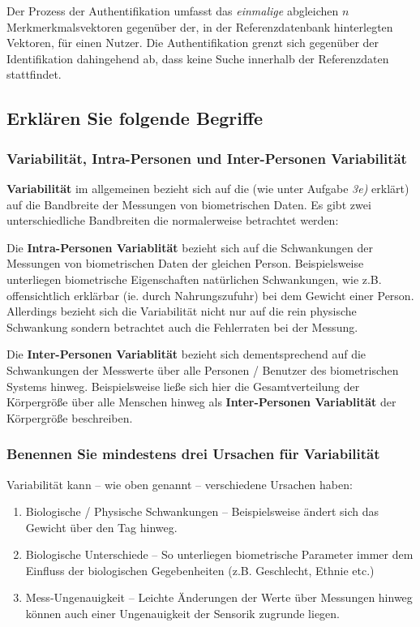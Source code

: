 \documentclass{article}
\begin{document}
Der Prozess der Authentifikation umfasst das \textit{einmalige} abgleichen $n$ Merkmerkmalsvektoren 
gegenüber der, in der Referenzdatenbank hinterlegten Vektoren, für einen Nutzer. 
Die Authentifikation grenzt sich gegenüber der Identifikation dahingehend ab, dass keine Suche innerhalb 
der Referenzdaten stattfindet.

\subsection{Erklären Sie folgende Begriffe}

\subsubsection{Variabilität, Intra-Personen und Inter-Personen Variabilität}

\textbf{Variabilität} im allgemeinen bezieht sich auf die (wie unter Aufgabe \textit{3e)} erklärt) auf
die Bandbreite der Messungen von biometrischen Daten. Es gibt zwei unterschiedliche Bandbreiten die 
normalerweise betrachtet werden:

Die \textbf{Intra-Personen Variablität} bezieht sich auf die Schwankungen der Messungen von biometrischen
Daten der gleichen Person. Beispielsweise unterliegen biometrische Eigenschaften natürlichen Schwankungen,
wie z.B. offensichtlich erklärbar (ie. durch Nahrungszufuhr) bei dem Gewicht einer Person. Allerdings
bezieht sich die Variabilität nicht nur auf die rein physische Schwankung sondern betrachtet auch die
Fehlerraten bei der Messung.

Die \textbf{Inter-Personen Variablität} bezieht sich dementsprechend auf die Schwankungen der Messwerte 
über alle Personen / Benutzer des biometrischen Systems hinweg. Beispielsweise ließe sich hier die 
Gesamtverteilung der Körpergröße über alle Menschen hinweg als \textbf{Inter-Personen Variablität} der 
Körpergröße beschreiben.

\subsubsection{Benennen Sie mindestens drei Ursachen für Variabilität}

Variabilität kann – wie oben genannt – verschiedene Ursachen haben:

\begin{enumerate}
	\item Biologische / Physische Schwankungen – Beispielsweise ändert sich das Gewicht über den Tag hinweg.
	\item Biologische Unterschiede – So unterliegen biometrische Parameter immer dem Einfluss der biologischen Gegebenheiten (z.B. Geschlecht, Ethnie etc.)
	\item Mess-Ungenauigkeit – Leichte Änderungen der Werte über Messungen hinweg können auch einer Ungenauigkeit der Sensorik zugrunde liegen.
\end{enumerate}
 
\end{document}

